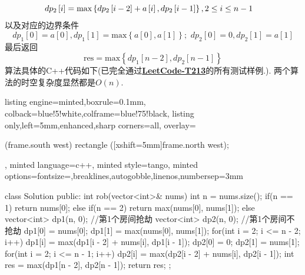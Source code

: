 \documentclass{article}
\begin{document}
\begin{homeworkProblem}
\begin{align}
		\\
		dp_2\left[ i \right] &=\text{max} \left\{ dp_2\left[ i-2 \right] +a\left[ i \right] ,dp_2\left[ i-1 \right] \right\} ,  2\le i\le n-1 \notag
	\end{align}
	以及对应的边界条件
	$$
	dp_1\left[ 0 \right] =a\left[ 0 \right] , dp_1\left[ 1 \right] =\text{max} \left\{ a\left[ 0 \right] ,a\left[ 1 \right] \right\} ;\,\, dp_2\left[ 0 \right] =0, dp_2\left[ 1 \right] =a\left[ 1 \right] 
	$$
	最后返回$$\text{res}=\text{max} \left\{ dp_1\left[ n-2 \right] ,dp_2\left[ n-1 \right] \right\} $$
	算法具体的C++代码如下(已完全通过\href{https://leetcode.cn/problems/house-robber-ii/description/}{\textbf{LeetCode-T213}}的所有测试样例.). 两个算法的时空复杂度显然都是$O(n)$.
\begin{tcblisting}{listing engine=minted,boxrule=0.1mm,
colback=blue!5!white,colframe=blue!75!black,
listing only,left=5mm,enhanced,sharp corners=all,
overlay={\begin{tcbclipinterior} (frame.south west)
rectangle ([xshift=5mm]frame.north west);\end{tcbclipinterior}},
minted language=c++,
minted style=tango,
minted options={fontsize=\small,breaklines,autogobble,linenos,numbersep=3mm}}
class Solution {
public:
    int rob(vector<int>& nums) {
        int n = nums.size();
        if(n == 1) {
            return nums[0];
        }
        else if(n == 2) {
            return max(nums[0], nums[1]);
        }
        else {
            vector<int> dp1(n, 0); //第1个房间抢劫
            vector<int> dp2(n, 0); //第1个房间不抢劫
            dp1[0] = nums[0];
            dp1[1] = max(nums[0], nums[1]);
            for(int i = 2; i <= n - 2; i++) {
                dp1[i] = max(dp1[i - 2] + nums[i], dp1[i - 1]);
            }
            dp2[0] = 0;
            dp2[1] = nums[1];
            for(int i = 2; i <= n - 1; i++) {
                dp2[i] = max(dp2[i - 2] + nums[i], dp2[i - 1]);
            }
            int res = max(dp1[n - 2], dp2[n - 1]);
            return res;
        }
    }
};
\end{tcblisting}
\end{homeworkProblem}


\pagebreak
\end{document}
